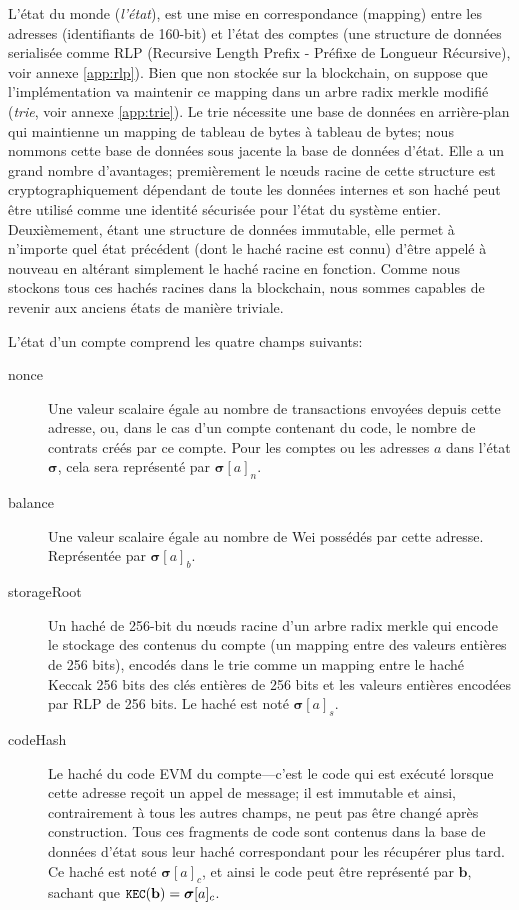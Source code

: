 \documentclass[9pt,oneside]{amsart}
\begin{document}
\begin{multicols}{2}
L'état du monde (\textit{l'état}), est une mise en correspondance (mapping) entre les adresses (identifiants de 160-bit) et l'état des comptes (une structure de données serialisée comme RLP (Recursive Length Prefix - Préfixe de Longueur Récursive), voir annexe \ref{app:rlp}). Bien que non stockée sur la blockchain, on suppose que l'implémentation va maintenir ce mapping dans un arbre radix merkle modifié (\textit{trie}, voir annexe \ref{app:trie}). Le trie nécessite une base de données en arrière-plan qui maintienne un mapping de tableau de bytes à tableau de bytes; nous nommons cette base de données sous jacente la base de données d'état. Elle a un grand nombre d'avantages; premièrement le n\oe{}uds racine de cette structure est cryptographiquement dépendant de toute les données internes et son haché peut être utilisé comme une identité sécurisée pour l'état du système entier. Deuxièmement, étant une structure de données immutable, elle permet à n'importe quel état précédent (dont le haché racine est connu) d’être appelé à nouveau en altérant simplement le haché racine en fonction. Comme nous stockons tous ces hachés racines dans la blockchain, nous sommes capables de revenir aux anciens états de manière triviale.

L'état d'un compte comprend les quatre champs suivants:	

\begin{description}
\item[nonce] Une valeur scalaire égale au nombre de transactions envoyées depuis cette adresse, ou, dans le cas d'un compte contenant du code, le nombre de contrats créés par ce compte. Pour les comptes ou les adresses $a$ dans l'état $\boldsymbol{\sigma}$, cela sera représenté par $\boldsymbol{\sigma}[a]_n$.
\item[balance] Une valeur scalaire égale au nombre de Wei possédés par cette adresse. Représentée par $\boldsymbol{\sigma}[a]_b$.
\item[storageRoot] Un haché de 256-bit du n\oe{}uds racine d'un arbre radix merkle qui encode le stockage des contenus du compte (un mapping entre des valeurs entières de 256 bits), encodés dans le trie comme un mapping entre le haché Keccak 256 bits des clés entières de 256 bits et les valeurs entières encodées par RLP de 256 bits. Le haché est noté $\boldsymbol{\sigma}[a]_s$.
\item[codeHash] Le haché du code EVM du compte---c'est le code qui est exécuté lorsque cette adresse reçoit un appel de message; il est immutable et ainsi, contrairement à tous les autres champs, ne peut pas être changé après construction. Tous ces fragments de code sont contenus dans la base de données d'état sous leur haché correspondant pour les récupérer plus tard. Ce haché est noté $\boldsymbol{\sigma}[a]_c$, et ainsi le code peut être représenté par $\mathbf{b}$, sachant que $\texttt{\small KEC}(\mathbf{b}) = \boldsymbol{\sigma}[a]_c$.
\end{description}


\end{multicols}
\end{document}
